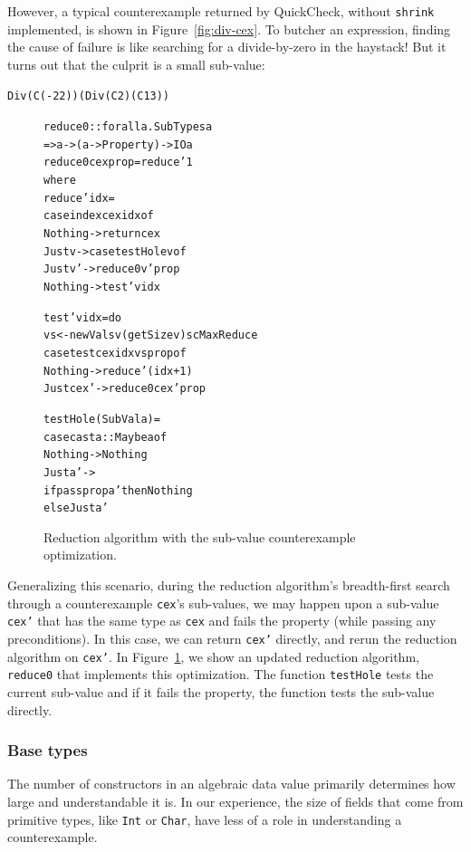 \documentclass[10pt]{sigplanconf}
\newenvironment{code}{\begin{alltt}}{\end{alltt}}
\newcommand{\ttp}[1]{\texttt{#1}}
\begin{document}
However, a typical counterexample returned by QuickCheck, without \ttp{shrink}
implemented, is shown in Figure~\ref{fig:div-cex}.  To butcher an expression,
finding the cause of failure is like searching for a divide-by-zero in the
haystack!  But it turns out that the culprit is a small sub-value:
%
\begin{code}
Div (C (-22)) (Div (C 2) (C 13))
\end{code}
%

\begin{figure}
\begin{code}
reduce0 :: forall a . SubTypes a
        => a -> (a -> Property) -> IO a
reduce0 cex prop = reduce' 1
  where
  reduce' idx =
    case index cex idx of
      Nothing -> return cex
      Just v  -> case testHole v of
                   Just v' -> reduce0 v' prop
                   Nothing -> test' v idx

  test' v idx = do
    vs <- newVals v (getSize v) scMaxReduce
    case test cex idx vs prop of
      Nothing   -> reduce' (idx+1)
      Just cex' -> reduce0 cex' prop

  testHole (SubVal a) =
    case cast a :: Maybe a of
      Nothing -> Nothing
      Just a' ->
        if pass prop a' then Nothing
          else Just a'
\end{code}
  \caption{Reduction algorithm with the sub-value counterexample optimization.}
  \label{fig:reduce0}
\end{figure}

Generalizing this scenario, during the reduction algorithm's breadth-first
search through a counterexample \ttp{cex}'s sub-values, we may happen upon a
sub-value \ttp{cex'} that has the same type as \ttp{cex} and fails the property
(while passing any preconditions).  In this case, we can return \ttp{cex'}
directly, and rerun the reduction algorithm on \ttp{cex'}.  In
Figure~\ref{fig:reduce0}, we show an updated reduction algorithm, \ttp{reduce0}
that implements this optimization.  The function \ttp{testHole} tests the
current sub-value and if it fails the property, the function tests the sub-value
directly.

\subsubsection{Base types}\label{sec:base}

The number of constructors in an algebraic data value primarily determines how
large and understandable it is.  In our experience, the size of fields that come
from primitive types, like \ttp{Int} or \ttp{Char}, have less of a role in
understanding a counterexample.
\end{document}
